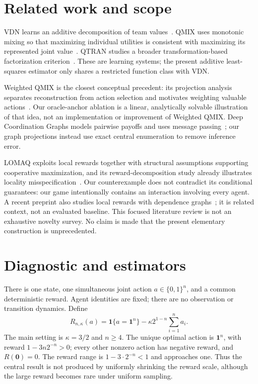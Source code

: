 \documentclass[10pt]{article}
\newcommand{\one}{\mathbf{1}}
\begin{document}
\section{Related work and scope}
VDN learns an additive decomposition of team values~\cite{sunehag2018vdn}. QMIX uses monotonic mixing so that maximizing individual utilities is consistent with maximizing its represented joint value~\cite{rashid2018qmix}. QTRAN studies a broader transformation-based factorization criterion~\cite{son2019qtran}. These are learning systems; the present additive least-squares estimator only shares a restricted function class with VDN.

Weighted QMIX is the closest conceptual precedent: its projection analysis separates reconstruction from action selection and motivates weighting valuable actions~\cite{rashid2020weighted}. Our oracle-anchor ablation is a linear, analytically solvable illustration of that idea, not an implementation or improvement of Weighted QMIX. Deep Coordination Graphs models pairwise payoffs and uses message passing~\cite{boehmer2020dcg}; our graph projections instead use exact central enumeration to remove inference error.

LOMAQ exploits local rewards together with structural assumptions supporting cooperative maximization, and its reward-decomposition study already illustrates locality misspecification~\cite{zohar2022lomaq}. Our counterexample does not contradict its conditional guarantees: our game intentionally contains an interaction involving every agent. A recent preprint also studies local rewards with dependence graphs~\cite{le2026explicit}; it is related context, not an evaluated baseline. This focused literature review is not an exhaustive novelty survey. No claim is made that the present elementary construction is unprecedented.

\section{Diagnostic and estimators}
There is one state, one simultaneous joint action $a\in\{0,1\}^n$, and a common deterministic reward. Agent identities are fixed; there are no observation or transition dynamics. Define
\begin{equation}
 R_{n,\kappa}(a)=\one\{a=\one^n\}-\kappa 2^{1-n}\sum_{i=1}^n a_i.\label{eq:game}
\end{equation}
The main setting is $\kappa=3/2$ and $n\geq4$. The unique optimal action is $\one^n$, with reward $1-3n2^{-n}>0$; every other nonzero action has negative reward, and $R(\mathbf0)=0$. The reward range is $1-3\cdot2^{-n}<1$ and approaches one. Thus the central result is not produced by uniformly shrinking the reward scale, although the large reward becomes rare under uniform sampling.
\end{document}
